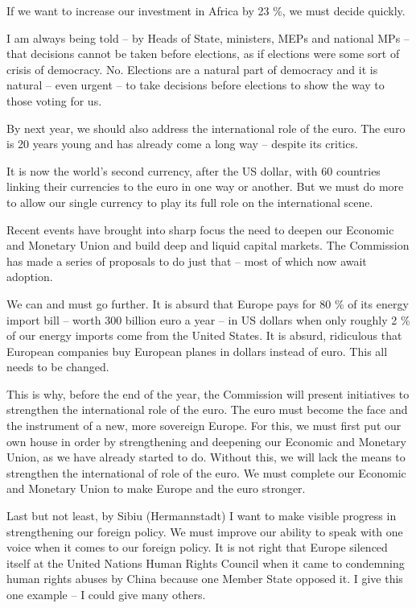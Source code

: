 \documentclass[a4paper,11pt]{article}
\begin{document}
If we want to increase our investment in Africa by 23 \%, we must decide quickly.

I am always being told – by Heads of State, ministers, MEPs and national MPs – that decisions cannot be taken before elections, as if elections were some sort of crisis of democracy. No. Elections are a natural part of democracy and it is natural – even urgent – to take decisions before elections to show the way to those voting for us.

By next year, we should also address the international role of the euro. The euro is 20 years young and has already come a long way – despite its critics.

It is now the world's second currency, after the US dollar, with 60 countries linking their currencies to the euro in one way or another. But we must do more to allow our single currency to play its full role on the international scene.

Recent events have brought into sharp focus the need to deepen our Economic and Monetary Union and build deep and liquid capital markets. The Commission has made a series of proposals to do just that – most of which now await adoption.

We can and must go further. It is absurd that Europe pays for 80 \% of its energy import bill – worth 300 billion euro a year – in US dollars when only roughly 2 \% of our energy imports come from the United States. It is absurd, ridiculous that European companies buy European planes in dollars instead of euro. This all needs to be changed.

This is why, before the end of the year, the Commission will present initiatives to strengthen the international role of the euro. The euro must become the face and the instrument of a new, more sovereign Europe. For this, we must first put our own house in order by strengthening and deepening our Economic and Monetary Union, as we have already started to do. Without this, we will lack the means to strengthen the international of role of the euro. We must complete our Economic and Monetary Union to make Europe and the euro stronger.

Last but not least, by Sibiu (Hermannstadt) I want to make visible progress in strengthening our foreign policy. We must improve our ability to speak with one voice when it comes to our foreign policy. It is not right that Europe silenced itself at the United Nations Human Rights Council when it came to condemning human rights abuses by China because one Member State opposed it. I give this one example – I could give many others.
\end{document}
